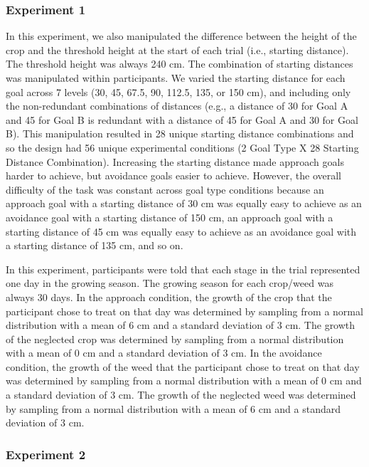 \documentclass[a4paper,doc,natbib,donotrepeattitle]{apa6}
\begin{document}
\subsubsection{Experiment 1}

In this experiment, we also manipulated the difference between the height of the crop and the threshold height at the start of each trial (i.e., starting distance). The threshold height was always 240 cm. The combination of starting distances was manipulated within participants. We varied the starting distance for each goal across 7 levels (30, 45, 67.5, 90, 112.5, 135, or 150 cm), and including only the non-redundant combinations of distances (e.g., a distance of 30 for Goal A and 45 for Goal B is redundant with a distance of 45 for Goal A and 30 for Goal B). This manipulation resulted in 28 unique starting distance combinations and so the design had 56 unique experimental conditions (2 Goal Type X 28 Starting Distance Combination). Increasing the starting distance made approach goals harder to achieve, but avoidance goals easier to achieve. However, the overall difficulty of the task was constant across goal type conditions because an approach goal with a starting distance of 30 cm was equally easy to achieve as an avoidance goal with a starting distance of 150 cm, an approach goal with a starting distance of 45 cm was equally easy to achieve as an avoidance goal with a starting distance of 135 cm, and so on.

In this experiment, participants were told that each stage in the trial represented one day in the growing season. The growing season for each crop/weed was always 30 days. In the approach condition, the growth of the crop that the participant chose to treat on that day was determined by sampling from a normal distribution with a mean of 6 cm and a standard deviation of 3 cm. The growth of the neglected crop was determined by sampling from a normal distribution with a mean of 0 cm and a standard deviation of 3 cm. In the avoidance condition, the growth of the weed that the participant chose to treat on that day was determined by sampling from a normal distribution with a mean of 0 cm and a standard deviation of 3 cm. The growth of the neglected weed was determined by sampling from a normal distribution with a mean of 6 cm and a standard deviation of 3 cm.

\subsubsection{Experiment 2}
\end{document}
